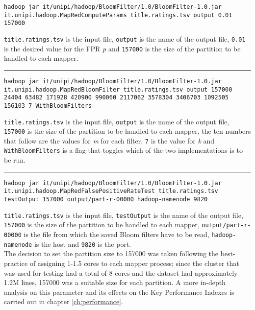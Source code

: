 \begin{lstlisting}[basicstyle=\ttfamily\footnotesize, breaklines=true, backgroundcolor = \color{lightgray}]
hadoop jar it/unipi/hadoop/BloomFilter/1.0/BloomFilter-1.0.jar it.unipi.hadoop.MapRedComputeParams title.ratings.tsv output 0.01 157000
\end{lstlisting}
\hfill \break
\texttt{title.ratings.tsv} is the input file, \texttt{output} is the name of the output file, \texttt{0.01} is the desired value for the FPR \textit{p} and \texttt{157000} is the size of the partition to be handled to each mapper.
\vspace{5pt}
\hrule
\vspace{6pt}
\begin{lstlisting}[basicstyle=\ttfamily\footnotesize, breaklines=true, backgroundcolor = \color{lightgray}]
hadoop jar it/unipi/hadoop/BloomFilter/1.0/BloomFilter-1.0.jar it.unipi.hadoop.MapRedBloomFilter title.ratings.tsv output 157000 24404 63482 171928 420900 990060 2117062 3578304 3406703 1092505 156103 7 WithBloomFilters
\end{lstlisting}
\hfill \break
\texttt{title.ratings.tsv} is the input file, \texttt{output} is the name of the output file, \texttt{157000} is the size of the partition to be handled to each mapper, the ten numbers that follow are the values for \textit{m} for each filter, \texttt{7} is the value for \textit{k} and \texttt{WithBloomFilters} is a flag that toggles which of the two implementations is to be run.
\vspace{5pt}
\hrule
\vspace{6pt}
\begin{lstlisting}[basicstyle=\ttfamily\footnotesize, breaklines=true, backgroundcolor = \color{lightgray}]
hadoop jar it/unipi/hadoop/BloomFilter/1.0/BloomFilter-1.0.jar it.unipi.hadoop.MapRedFalsePositiveRateTest title.ratings.tsv testOutput 157000 output/part-r-00000 hadoop-namenode 9820
\end{lstlisting}
\hfill \break
\texttt{title.ratings.tsv} is the input file, \texttt{testOutput} is the name of the output file, \texttt{157000} is the size of the partition to be handled to each mapper, \texttt{output/part-r-00000} is the file from which the saved Bloom filters have to be read, \texttt{hadoop-namenode} is the host and \texttt{9820} is the port.\\
\hfill \break
The decision to set the partition size to 157000 was taken following the best-practice of assigning 1-1.5 cores to each mapper process; since the cluster that was used for testing had a total of 8 cores and the dataset had approximately 1.2M lines, 157000 was a suitable size for each partition. A more in-depth analysis on this parameter and its effects on the Key Performance Indexes is carried out in chapter \ref{ch:performance}.\\
